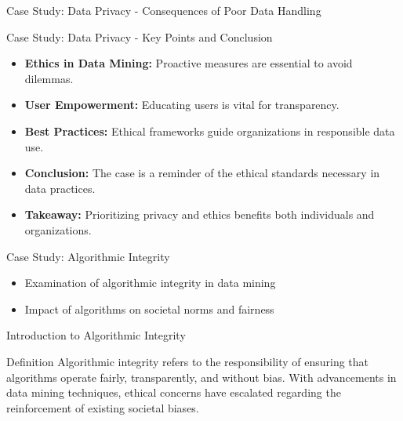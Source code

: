 \documentclass[aspectratio=169]{beamer}
\begin{document}
\begin{frame}[fragile]{Case Study: Data Privacy - Consequences of Poor Data Handling}
\end{frame}

\begin{frame}[fragile]{Case Study: Data Privacy - Key Points and Conclusion}
    \begin{itemize}
        \item \textbf{Ethics in Data Mining:} Proactive measures are essential to avoid dilemmas.
        \item \textbf{User Empowerment:} Educating users is vital for transparency.
        \item \textbf{Best Practices:} Ethical frameworks guide organizations in responsible data use.
        \item \textbf{Conclusion:} The case is a reminder of the ethical standards necessary in data practices.
        \item \textbf{Takeaway:} Prioritizing privacy and ethics benefits both individuals and organizations.
    \end{itemize}
\end{frame}

\begin{frame}[fragile]{Case Study: Algorithmic Integrity}
    \begin{itemize}
        \item Examination of algorithmic integrity in data mining
        \item Impact of algorithms on societal norms and fairness
    \end{itemize}
\end{frame}

\begin{frame}[fragile]{Introduction to Algorithmic Integrity}
    \begin{block}{Definition}
        Algorithmic integrity refers to the responsibility of ensuring that algorithms operate fairly, transparently, and without bias. With advancements in data mining techniques, ethical concerns have escalated regarding the reinforcement of existing societal biases.
    \end{block}
\end{frame}
\end{document}
